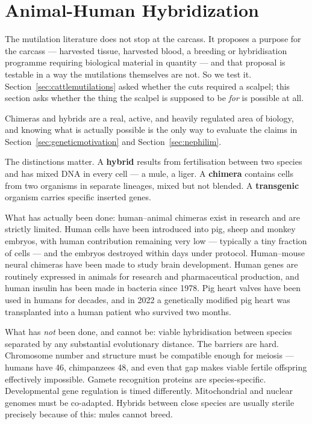 \section{Animal-Human Hybridization}\label{sec:animalhumanhybridization}

The mutilation literature does not stop at the carcass. It proposes a purpose for the carcass ---
harvested tissue, harvested blood, a breeding or hybridisation programme requiring biological
material in quantity --- and that proposal is testable in a way the mutilations themselves are not.
So we test it. Section~\ref{sec:cattlemutilations} asked whether the cuts required a scalpel;
this section asks whether the thing the scalpel is supposed to be \emph{for} is possible at all.

Chimeras and hybrids are a real, active, and heavily regulated area of biology, and knowing what
is actually possible is the only way to evaluate the claims in Section~\ref{sec:geneticmotivation} and Section~\ref{sec:nephilim}.

The distinctions matter. A \textbf{hybrid} results from fertilisation between two species and
has mixed DNA in every cell --- a mule, a liger. A \textbf{chimera} contains cells from two
organisms in separate lineages, mixed but not blended. A \textbf{transgenic} organism carries
specific inserted genes.

What has actually been done: human--animal chimeras exist in research and are strictly limited.
Human cells have been introduced into pig, sheep and monkey embryos, with human contribution
remaining very low --- typically a tiny fraction of cells --- and the embryos destroyed within
days under protocol. Human--mouse neural chimeras have been made to study brain development.
Human genes are routinely expressed in animals for research and pharmaceutical production, and
human insulin has been made in bacteria since 1978. Pig heart valves have been used in humans for
decades, and in 2022 a genetically modified pig heart was transplanted into a human patient who
survived two months.

What has \emph{not} been done, and cannot be: viable hybridisation between species separated by
any substantial evolutionary distance. The barriers are hard. Chromosome number and structure
must be compatible enough for meiosis --- humans have 46, chimpanzees 48, and even that gap makes
viable fertile offspring effectively impossible. Gamete recognition proteins are
species-specific. Developmental gene regulation is timed differently. Mitochondrial and nuclear
genomes must be co-adapted. Hybrids between close species are usually sterile precisely because
of this: mules cannot breed.

